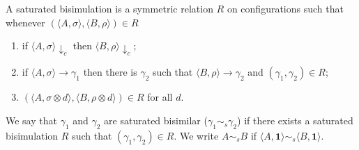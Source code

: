 \documentclass{llncs}
\def\monid{{\mathbf 0}}
\def\monid{\mathbf{1}}
\begin{document}
\begin{definition}\label{def:strongsb} A saturated bisimulation is a symmetric relation $R$ on configurations such that whenever
$( \langle A, \sigma \rangle,\langle B, \rho \rangle) \in R$
\begin{enumerate}
\item if $\langle A, \sigma \rangle \downarrow_c$ then $\langle B, \rho \rangle \downarrow_c$;
\item if $\langle A, \sigma \rangle \to \gamma_1$ then there is $\gamma_2$ such that $\langle B, \rho \rangle \to \gamma_2$ and $(\gamma_1, \gamma_2) \in R$;
\item $(\langle A,\sigma \otimes d\rangle, \langle B,\rho \otimes d \rangle) \in R$ for  all $d$.
\end{enumerate}
We say that $\gamma_1$ and $\gamma_2$ are  saturated bisimilar ($\gamma_1  \sim_{\mathit{s}} \gamma_2$) if there exists a  saturated  bisimulation $R$ such that $(\gamma_1 , \gamma_2 ) \in R$. We write $A \sim_{\mathit{s}} B$ if $\langle A, \monid \rangle \sim_{\mathit{s}} \langle B, \monid \rangle$.
\end{definition}
\end{document}
